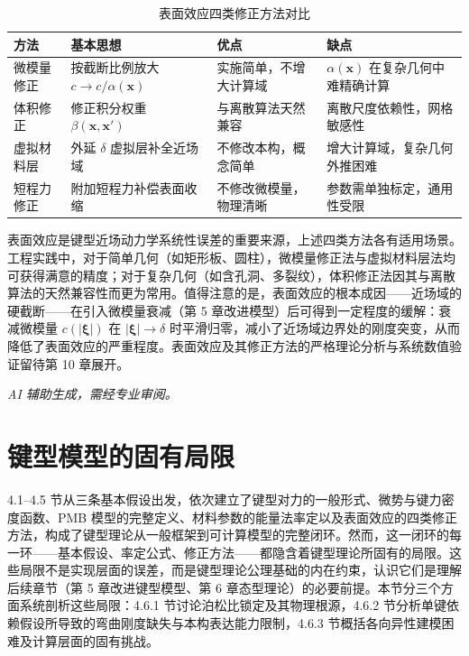 \begin{table}[htbp]
\centering
\small
\caption{表面效应四类修正方法对比}
\label{tab:surface-methods}
\begin{tabular}{>{\raggedright\arraybackslash}p{}>{\raggedright\arraybackslash}p{}>{\raggedright\arraybackslash}p{}>{\raggedright\arraybackslash}p{}}
\toprule
方法 & 基本思想 & 优点 & 缺点 \\
\midrule
微模量修正 & 按截断比例放大 $c\to c/\alpha(\mathbf{x})$ & 实施简单，不增大计算域 & $\alpha(\mathbf{x})$ 在复杂几何中难精确计算 \\
体积修正 & 修正积分权重 $\beta(\mathbf{x},\mathbf{x}')$ & 与离散算法天然兼容 & 离散尺度依赖性，网格敏感性 \\
虚拟材料层 & 外延 $\delta$ 虚拟层补全近场域 & 不修改本构，概念简单 & 增大计算域，复杂几何外推困难 \\
短程力修正 & 附加短程力补偿表面收缩 & 不修改微模量，物理清晰 & 参数需单独标定，通用性受限 \\
\bottomrule
\end{tabular}
\end{table}

表面效应是键型近场动力学系统性误差的重要来源，上述四类方法各有适用场景。工程实践中，对于简单几何（如矩形板、圆柱），微模量修正法与虚拟材料层法均可获得满意的精度；对于复杂几何（如含孔洞、多裂纹），体积修正法因其与离散算法的天然兼容性而更为常用。值得注意的是，表面效应的根本成因——近场域的硬截断——在引入微模量衰减（第 5 章改进模型）后可得到一定程度的缓解：衰减微模量 $c(|\boldsymbol{\xi}|)$ 在 $|\boldsymbol{\xi}|\to\delta$ 时平滑归零，减小了近场域边界处的刚度突变，从而降低了表面效应的严重程度。表面效应及其修正方法的严格理论分析与系统数值验证留待第 10 章展开。

\emph{AI 辅助生成，需经专业审阅。}

\section{键型模型的固有局限}

4.1--4.5 节从三条基本假设出发，依次建立了键型对力的一般形式、微势与键力密度函数、PMB 模型的完整定义、材料参数的能量法率定以及表面效应的四类修正方法，构成了键型理论从一般框架到可计算模型的完整闭环。然而，这一闭环的每一环——基本假设、率定公式、修正方法——都隐含着键型理论所固有的局限。这些局限不是实现层面的误差，而是键型理论公理基础的内在约束，认识它们是理解后续章节（第 5 章改进键型模型、第 6 章态型理论）的必要前提。本节分三个方面系统剖析这些局限：4.6.1 节讨论泊松比锁定及其物理根源，4.6.2 节分析单键依赖假设所导致的弯曲刚度缺失与本构表达能力限制，4.6.3 节概括各向异性建模困难及计算层面的固有挑战。

